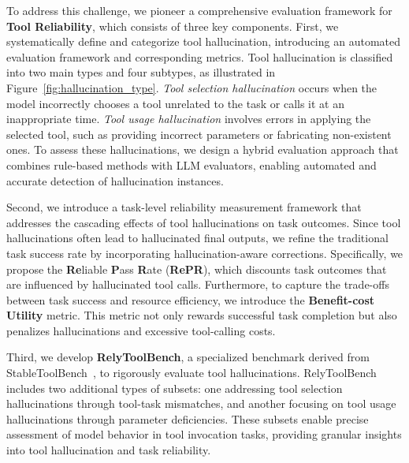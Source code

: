 To address this challenge, we pioneer a comprehensive evaluation framework for \textbf{Tool Reliability}, which consists of three key components. First, we systematically define and categorize tool hallucination, introducing an automated evaluation framework and corresponding metrics. Tool hallucination is classified into two main types and four subtypes, as illustrated in Figure~\ref{fig:hallucination_type}. \textit{Tool selection hallucination} occurs when the model incorrectly chooses a tool unrelated to the task or calls it at an inappropriate time. \textit{Tool usage hallucination} involves errors in applying the selected tool, such as providing incorrect parameters or fabricating non-existent ones.  To assess these hallucinations, we design a hybrid evaluation approach that combines rule-based methods with LLM evaluators, enabling automated and accurate detection of hallucination instances.

Second, we introduce a task-level reliability measurement framework that addresses the cascading effects of tool hallucinations on task outcomes. Since tool hallucinations often lead to hallucinated final outputs, we refine the traditional task success rate by incorporating hallucination-aware corrections. Specifically, we propose the \textbf{Re}liable \textbf{P}ass \textbf{R}ate (\textbf{RePR}), which discounts task outcomes that are influenced by hallucinated tool calls. Furthermore, to capture the trade-offs between task success and resource efficiency, we introduce the \textbf{Benefit-cost Utility} metric. This metric not only rewards successful task completion but also penalizes hallucinations and excessive tool-calling costs.

Third, we develop \textbf{RelyToolBench}, a specialized benchmark derived from StableToolBench~\cite{guo2024stabletoolbench}, to rigorously evaluate tool hallucinations. RelyToolBench includes two additional types of subsets: one addressing tool selection hallucinations through tool-task mismatches, and another focusing on tool usage hallucinations through parameter deficiencies. These subsets enable precise assessment of model behavior in tool invocation tasks, providing granular insights into tool hallucination and task reliability.


